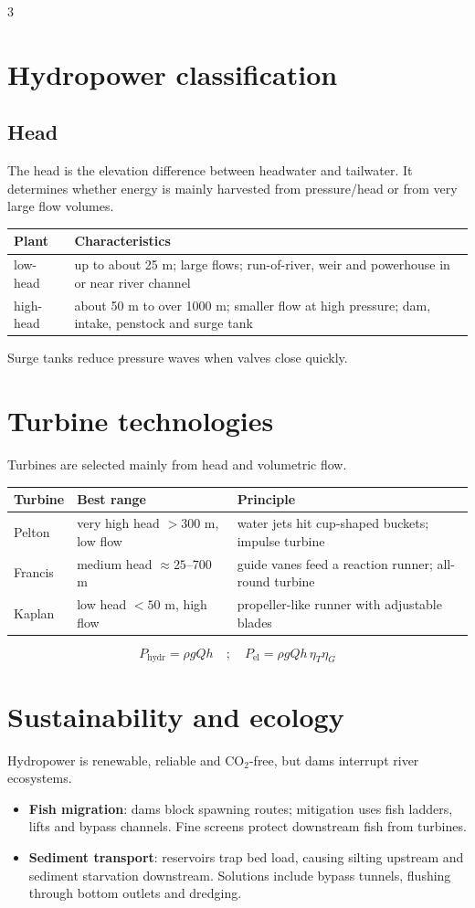 \documentclass[9pt, landscape, a4paper]{article}
\begin{document}
\begin{multicols*}{3}
\section{Hydropower classification}
\subsection{Head}
The head is the elevation difference between headwater and tailwater. It
determines whether energy is mainly harvested from pressure/head or from very
large flow volumes.

\begin{tabularx}{\columnwidth}{@{}lX@{}}
  \toprule
  \textbf{Plant} & \textbf{Characteristics}\\
  \midrule
  low-head & up to about 25 m; large flows; run-of-river, weir and powerhouse in or near river channel\\
  high-head & about 50 m to over 1000 m; smaller flow at high pressure; dam, intake, penstock and surge tank\\
  \bottomrule
\end{tabularx}
Surge tanks reduce pressure waves when valves close quickly.

\section{Turbine technologies}
Turbines are selected mainly from head and volumetric flow.
\begin{tabularx}{\columnwidth}{@{}lXX@{}}
  \toprule
  \textbf{Turbine} & \textbf{Best range} & \textbf{Principle}\\
  \midrule
  Pelton & very high head $>300$ m, low flow & water jets hit cup-shaped buckets; impulse turbine\\
  Francis & medium head $\approx25$--700 m & guide vanes feed a reaction runner; all-round turbine\\
  Kaplan & low head $<50$ m, high flow & propeller-like runner with adjustable blades\\
  \bottomrule
\end{tabularx}
\[
  P_{\mathrm{hydr}}=\rho gQh
  \quad ; \quad
  P_{\mathrm{el}}=\rho gQh\,\eta_T\eta_G
\]

\section{Sustainability and ecology}
Hydropower is renewable, reliable and CO$_2$-free, but dams interrupt river
ecosystems.
\begin{itemize}
  \item \textbf{Fish migration}: dams block spawning routes; mitigation uses
        fish ladders, lifts and bypass channels. Fine screens protect
        downstream fish from turbines.
  \item \textbf{Sediment transport}: reservoirs trap bed load, causing silting
        upstream and sediment starvation downstream. Solutions include bypass
        tunnels, flushing through bottom outlets and dredging.
\end{itemize}


\end{multicols*}
\end{document}
